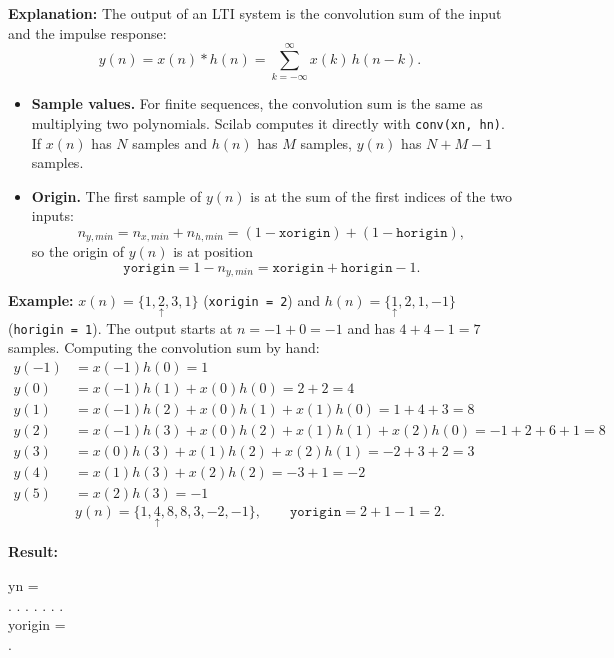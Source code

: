 \documentclass[12pt,a4paper]{article}
\newcommand{\org}[1]{\underset{\uparrow}{#1}}
\begin{document}
\textbf{Explanation:}
The output of an LTI system is the convolution sum of the input and the impulse response:
\begin{equation}
    y(n) = x(n) * h(n) = \sum_{k=-\infty}^{\infty} x(k)\,h(n-k).
\end{equation}
\begin{itemize}
    \item \textbf{Sample values.} For finite sequences, the convolution sum is the same as multiplying two polynomials. Scilab computes it directly with \texttt{conv(xn, hn)}. If $x(n)$ has $N$ samples and $h(n)$ has $M$ samples, $y(n)$ has $N+M-1$ samples.
    \item \textbf{Origin.} The first sample of $y(n)$ is at the sum of the first indices of the two inputs:
    \begin{equation}
        n_{y,min} = n_{x,min} + n_{h,min} = (1-\texttt{xorigin}) + (1-\texttt{horigin}),
    \end{equation}
    so the origin of $y(n)$ is at position
    \begin{equation}
        \texttt{yorigin} = 1 - n_{y,min} = \texttt{xorigin} + \texttt{horigin} - 1 .
    \end{equation}
\end{itemize}
\textbf{Example:} $x(n) = \{1, \org{2}, 3, 1\}$ (\texttt{xorigin = 2}) and $h(n) = \{\org{1}, 2, 1, -1\}$ (\texttt{horigin = 1}). The output starts at $n = -1 + 0 = -1$ and has $4 + 4 - 1 = 7$ samples. Computing the convolution sum by hand:
\begin{align*}
    y(-1) &= x(-1)h(0) = 1\\
    y(0)  &= x(-1)h(1) + x(0)h(0) = 2 + 2 = 4\\
    y(1)  &= x(-1)h(2) + x(0)h(1) + x(1)h(0) = 1 + 4 + 3 = 8\\
    y(2)  &= x(-1)h(3) + x(0)h(2) + x(1)h(1) + x(2)h(0) = -1 + 2 + 6 + 1 = 8\\
    y(3)  &= x(0)h(3) + x(1)h(2) + x(2)h(1) = -2 + 3 + 2 = 3\\
    y(4)  &= x(1)h(3) + x(2)h(2) = -3 + 1 = -2\\
    y(5)  &= x(2)h(3) = -1
\end{align*}
\begin{equation}
    y(n) = \{1, \org{4}, 8, 8, 3, -2, -1\}, \qquad \texttt{yorigin} = 2 + 1 - 1 = 2 .
\end{equation}


\textbf{Result:}
\begin{consoleoutput}
yn = \\
. . . . . . .\\
yorigin = \\
.
\end{consoleoutput}
\end{document}
